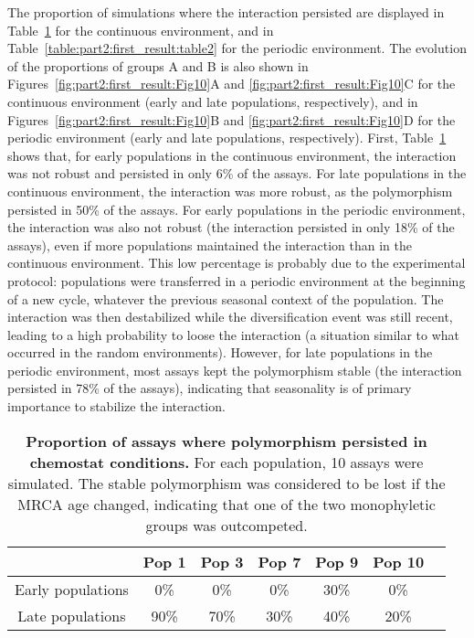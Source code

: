 The proportion of simulations where the interaction persisted are displayed in Table~\ref{table:part2:first_result:table1} for the continuous environment, and in Table~\ref{table:part2:first_result:table2} for the periodic environment. The evolution of the proportions of groups A and B is also shown in Figures~\ref{fig:part2:first_result:Fig10}A and \ref{fig:part2:first_result:Fig10}C for the continuous environment (early and late populations, respectively), and in Figures~\ref{fig:part2:first_result:Fig10}B and \ref{fig:part2:first_result:Fig10}D for the periodic environment (early and late populations, respectively).
First, Table~\ref{table:part2:first_result:table1} shows that, for early populations in the continuous environment, the interaction was not robust and persisted in only 6\% of the assays. For late populations in the continuous environment, the interaction was more robust, as the polymorphism persisted in 50\% of the assays.
For early populations in the periodic environment, the interaction was also not robust (the interaction persisted in only 18\% of the assays), even if more populations maintained the interaction than in the continuous environment. This low percentage is probably due to the experimental protocol: populations were transferred in a periodic environment at the beginning of a new cycle, whatever the previous seasonal context of the population. The interaction was then destabilized while the diversification event was still recent, leading to a high probability to loose the interaction (a situation similar to what occurred in the random environments). However, for late populations in the periodic environment, most assays kept the polymorphism stable (the interaction persisted in 78\% of the assays), indicating that seasonality is of primary importance to stabilize the interaction.

\begin{table}[!ht]
\centering
\caption[Proportion of assays where polymorphism persisted in chemostat conditions.]{{\bf Proportion of assays where polymorphism persisted in chemostat conditions.} For each population, 10 assays were simulated. The stable polymorphism was considered to be lost if the MRCA age changed, indicating that one of the two monophyletic groups was outcompeted.}
\begin{tabular}{|c|c|c|c|c|c|c|}
\hline
 & Pop 1 & Pop 3 & Pop 7 & Pop 9 & Pop 10\\
\hline
Early populations & 0\% & 0\% & 0\% & 30\% & 0\%\\
\hline
Late populations & 90\% & 70\% & 30\% & 40\% & 20\%\\
\hline
\end{tabular}
\label{table:part2:first_result:table1}
\end{table}

